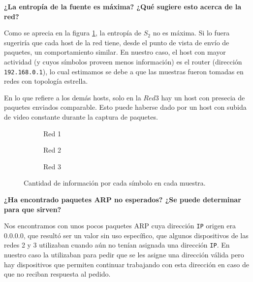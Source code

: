 \vspace{4mm}

\textbf{¿La entropía de la fuente es máxima? ¿Qué sugiere esto acerca de la red?}

Como se aprecia en la figura \ref{fig: informacion de los simbolos de s2}, la entropía de $S_{2}$ no es máxima. Si lo fuera sugeriría que cada host de la red tiene, desde el punto de vista de envío de paquetes, un comportamiento similar. En nuestro caso, el host con mayor actividad (y cuyos símbolos proveen menos información) es el router (dirección \texttt{192.168.0.1}), lo cual estimamos se debe a que las muestras fueron tomadas en redes con topología estrella.

\newpage

En lo que refiere a los demás hosts, solo en la $Red 3$ hay un host con presecia de paquetes enviados comparable. Esto puede haberse dado por un host con subida de video constante durante la captura de paquetes.

\begin{figure}[H]
    \centering
    \begin{subfigure}[b]{0.45\textwidth} 
        
        \centering
        \caption{Red 1}
    \end{subfigure}
    \begin{subfigure}[b]{0.45\textwidth} 
        
        \centering
        \caption{Red 2}
    \end{subfigure}
    \begin{subfigure}[b]{0.45\textwidth}  
        \centering
        
        \caption{Red 3}
    \end{subfigure}
    \caption{Cantidad de información por cada símbolo en cada muestra.}
    \label{fig: informacion de los simbolos de s2}
\end{figure}

\textbf{¿Ha encontrado paquetes ARP no esperados? ¿Se puede determinar para que sirven?}

Nos encontramos con unos pocos paquetes ARP cuya dirección \texttt{IP} origen era 0.0.0.0, que resultó ser un valor sin uso específico, que algunos dispositivos de las redes 2 y 3 utilizaban cuando aún no tenían asignada una dirección \texttt{IP}. En nuestro caso la utilizaban para pedir que se les asigne una dirección válida pero hay dispositivos que permiten continuar trabajando con esta dirección en caso de que no reciban respuesta al pedido.

